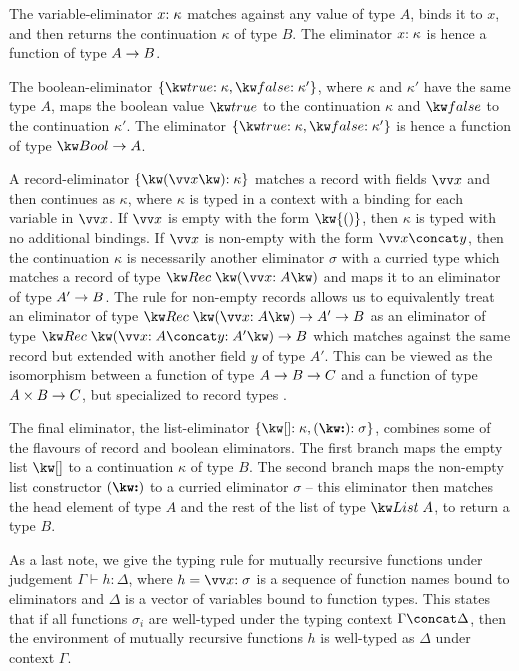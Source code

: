 

\noindent
The variable-eliminator ${x}{:}\;{\kappa}$ matches against any value of type $A$, binds it to $x$, and then returns the continuation $\kappa$ of type $B$. The eliminator ${x}{:}\;{\kappa}$ is hence a function of type ${A}\rightarrow{B}$.

The boolean-eliminator $\elimBool{\kappa}{\kappa'}$, where $\kappa$ and $\kappa'$ have the same type $A$, maps the boolean value $\exTrue$ to the continuation $\kappa$ and $\exFalse$ to the continuation $\kappa'$. The eliminator $\elimBool{\kappa}{\kappa'}$ is hence a function of type $\tyFun{\tyBool}{A}$. 

A record-eliminator $\elimRec{\seq{x}}{\kappa}$ matches a record with fields $\seq{x}$ and then continues as $\kappa$, where $\kappa$ is typed in a context with a binding for each variable in $\seq{x}$. If $\seq{x}$ is empty with the form $\kw{()}$, then $\kappa$ is typed with no additional bindings. If $\seq{x}$ is non-empty with the form $\vec{x} \concat y$, then the continuation $\kappa$ is necessarily another eliminator $\sigma$ with a curried type which matches a record of type $\tyRec{\vec{\bind{x}{A}}}$ and maps it to an eliminator of type ${A'}\rightarrow{B}$. The rule for non-empty records allows us to equivalently treat an eliminator of type $\tyFun{\tyRec{\vec{\bind{x}{A}}}}{\tyFun{A'}{B}}$ as an eliminator of type $\tyFun{\tyRec{\vec{\bind{x}{A}} \concat \bind{y}{A'}}}{B}$ which matches against the same record but extended with another field $y$ of type $A'$. This can be viewed as the isomorphism between a function of type ${{A}\rightarrow{B}}\rightarrow{C}$ and a function of type ${{A}\times{B}}\rightarrow{C}$, but specialized to record types \cite{hinze00}. 

The final eliminator, the list-eliminator $\elimList{\kappa}{\sigma}$, combines some of the flavours of record and boolean eliminators. The first branch maps the empty list $\exNil$ to a continuation $\kappa$ of type $B$. The second branch maps the non-empty list constructor $(\symCons)$ to a curried eliminator $\sigma$ -- this eliminator then matches the head element of type $A$ and the rest of the list of type $\tyList{A}$, to return a type $B$.

As a last note, we give the typing rule for mutually recursive functions under judgement $\Gamma \vdash h: \Delta$, where $h = \vec{\bind{x}{\sigma}}$ is a sequence of function names bound to eliminators and $\Delta$ is a vector of variables bound to function types. This states that if all functions $\sigma_i$ are well-typed under the typing context $\Gamma \concat \Delta$, then the environment of mutually recursive functions $h$ is well-typed as $\Delta$ under context $\Gamma$.


